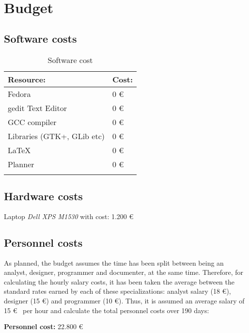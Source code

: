 \chapter{Budget}

\section{Software costs}\label{sec:SoftwareCosts}

\begin{table}[H]
  \begin{center}
    \begin{tabularx}{0.75\textwidth}{|X|X|}
      \firsthline
      \textbf{Resource:} & \textbf{Cost:} \\
      \hline
      Fedora & 0 \euro \\
      \hline
      gedit Text Editor & 0 \euro \\
      \hline
      GCC compiler & 0 \euro \\
      \hline
      Libraries (GTK+, GLib etc) & 0 \euro \\
      \hline
      \LaTeX & 0 \euro \\
      \hline
      Planner & 0 \euro \\
      \lasthline
    \end{tabularx}
    \caption{Software cost}
  \end{center}
\end{table}

\section{Hardware costs}\label{sec:HardwareCosts}

Laptop \emph{Dell XPS M1530} with cost: 1.200 \euro

\newpage
\section{Personnel costs}\label{sec:PersonnelCosts}

As planned, the budget assumes the time has been split between being an analyst, 
designer, programmer and documenter, at the same time. Therefore, for calculating 
the hourly salary costs, it has been taken the average between the standard rates 
earned by each of these specializations: analyst salary (18 \euro), designer 
(15 \euro) and programmer (10 \euro).  Thus, it is assumed an average salary of 
15 \euro~ per hour and calculate the total personnel costs over 190 days:

\noindent \textbf{Personnel cost:} 22.800 \euro
